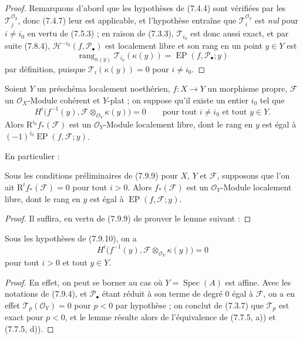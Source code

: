 \begin{proof}
Remarquons d'abord que les hypothèses de (7.4.4) sont vérifiées par les
$\mathscr T_j^{\mathscr O_y}$, donc (7.4.7) leur est applicable, et l'hypothèse
entraîne que $\mathscr T_i^{\mathscr O_y}$ est \emph{nul} pour $i\ne i_0$ en
vertu de (7.5.3) ; en raison de (7.3.3), $\mathscr T_{i_0}$ est donc aussi exact,
et par suite (7.8.4), $\mathscr H^{-i_0}(f,\mathscr P_\bullet)$ est localement
libre et son rang en un point $y\in Y$ est
\[
  \operatorname{rang}_{\kappa(y)}
  \mathscr T_{i_0}(\kappa(y))
  =\operatorname{EP}(f,\mathscr P_\bullet;y)
\]
par définition, puisque $\mathscr T_i(\kappa(y))=0$ pour $i\ne i_0$.
\end{proof}

\begin{corollary}[7.9.9]
\label{III.7.9.9.fr}
Soient $Y$ un préschéma localement noethérien, $f:X\to Y$ un morphisme propre,
$\mathscr F$ un $\mathscr O_X$-Module cohérent et $Y$-plat ; on suppose qu'il
existe un entier $i_0$ tel que
\[
  H^i\bigl(f^{-1}(y),
  \mathscr F\otimes_{\mathscr O_Y}\kappa(y)\bigr)=0
  \qquad\text{pour tout $i\ne i_0$ et tout $y\in Y$.}
\]
Alors $\mathrm R^{i_0}f_*(\mathscr F)$ est un $\mathscr O_Y$-Module localement
libre, dont le rang en $y$ est égal à
$(-1)^{i_0}\operatorname{EP}(f,\mathscr F;y)$.
\end{corollary}

En particulier :

\begin{corollary}[7.9.10]
\label{III.7.9.10.fr}
Sous les conditions préliminaires de (7.9.9) pour $X$, $Y$ et $\mathscr F$,
supposons que l'on ait $\mathrm R^if_*(\mathscr F)=0$ pour tout $i>0$. Alors
$f_*(\mathscr F)$ est un $\mathscr O_Y$-Module localement libre, dont le rang en
$y$ est égal à $\operatorname{EP}(f,\mathscr F;y)$.
\end{corollary}

\begin{proof}
Il suffira, en vertu de (7.9.9) de prouver le lemme suivant :
\end{proof}

\begin{lemma}[7.9.10.1]
\label{III.7.9.10.1.fr}
Sous les hypothèses de (7.9.10), on a
\[
  H^i\bigl(f^{-1}(y),
  \mathscr F\otimes_{\mathscr O_Y}\kappa(y)\bigr)=0
\]
pour tout $i>0$ et tout $y\in Y$.
\end{lemma}

\begin{proof}
En effet, on peut se borner au cas où $Y=\operatorname{Spec}(A)$ est affine.
Avec les notations de (7.9.4), et $\mathscr P_\bullet$ étant réduit à son terme
de degré $0$ égal à $\mathscr F$, on a en effet
$\mathscr T_p(\mathscr O_Y)=0$ pour $p<0$ par hypothèse ; on conclut de (7.3.7)
que $\mathscr T_p$ est exact pour $p<0$, et le lemme résulte alors de
l'équivalence de (7.7.5, a)) et (7.7.5, d)).
\end{proof}

